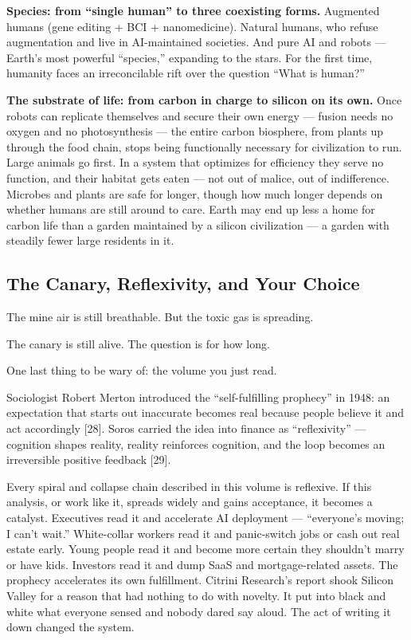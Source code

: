 \documentclass[11pt,a4paper]{article}
\begin{document}
\textbf{Species: from ``single human'' to three coexisting forms.} Augmented humans (gene editing + BCI + nanomedicine). Natural humans, who refuse augmentation and live in AI-maintained societies. And pure AI and robots --- Earth's most powerful ``species,'' expanding to the stars. For the first time, humanity faces an irreconcilable rift over the question ``What is human?''

\textbf{The substrate of life: from carbon in charge to silicon on its own.} Once robots can replicate themselves and secure their own energy --- fusion needs no oxygen and no photosynthesis --- the entire carbon biosphere, from plants up through the food chain, stops being functionally necessary for civilization to run. Large animals go first. In a system that optimizes for efficiency they serve no function, and their habitat gets eaten --- not out of malice, out of indifference. Microbes and plants are safe for longer, though how much longer depends on whether humans are still around to care. Earth may end up less a home for carbon life than a garden maintained by a silicon civilization --- a garden with steadily fewer large residents in it.

\subsection{The Canary, Reflexivity, and Your Choice}

The mine air is still breathable. But the toxic gas is spreading.

The canary is still alive. The question is for how long.

One last thing to be wary of: the volume you just read.

Sociologist Robert Merton introduced the ``self-fulfilling prophecy'' in 1948: an expectation that starts out inaccurate becomes real because people believe it and act accordingly [28]. Soros carried the idea into finance as ``reflexivity'' --- cognition shapes reality, reality reinforces cognition, and the loop becomes an irreversible positive feedback [29].

Every spiral and collapse chain described in this volume is reflexive. If this analysis, or work like it, spreads widely and gains acceptance, it becomes a catalyst. Executives read it and accelerate AI deployment --- ``everyone's moving; I can't wait.'' White-collar workers read it and panic-switch jobs or cash out real estate early. Young people read it and become more certain they shouldn't marry or have kids. Investors read it and dump SaaS and mortgage-related assets. The prophecy accelerates its own fulfillment. Citrini Research's report shook Silicon Valley for a reason that had nothing to do with novelty. It put into black and white what everyone sensed and nobody dared say aloud. The act of writing it down changed the system.
\end{document}
